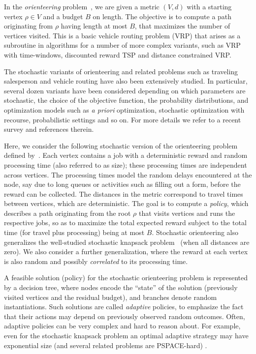 \documentclass[11pt,letterpaper]{article}
\numberwithin{algorithm}{section}
\begin{document}
In the {\em orienteering} problem~\cite{GLV87}, we are given a metric $(V,d)$ with a starting vertex $\rho\in V$ and a budget $B$ on length. The objective is to compute a path originating from $\rho$ having length at most $B$, that maximizes the number of vertices visited. This is a basic vehicle routing problem (VRP) that arises as a subroutine in algorithms for a number of more complex variants, such as VRP with
time-windows, discounted reward TSP and distance constrained VRP.


The stochastic variants of orienteering and related problems such as traveling salesperson and vehicle routing have also been extensively studied. In particular, several dozen variants have been considered depending on which parameters are stochastic, the choice of the objective function, the probability distributions, and optimization models such as {\em a priori} optimization, stochastic optimization with recourse, probabilistic settings and so on.
For more details we refer to a recent survey \cite{Weyland} and references therein.

Here, we consider the following stochastic version of the orienteering problem defined by~\cite{GKNR12}. Each vertex contains a job with a deterministic reward and random processing time (also referred to as size); these processing times are independent across vertices. The processing times  model the random delays encountered at the node, say due to long queues or activities such as filling out a form, before the reward can be collected. The distances in the metric correspond to travel times between vertices, which are deterministic. The goal is to compute a {\em policy}, which describes a path originating from the root $\rho$ that visits vertices and runs the respective jobs, so as to maximize the total expected reward subject to the total time (for travel plus processing) being at most $B$.
Stochastic orienteering also generalizes the well-studied stochastic knapsack problem~\cite{DeanGV08,BGK11,Bhalgat11} (when all distances are zero).
We also consider a further generalization, where the reward at each vertex is also random and possibly {\em correlated} to its processing time. 



A feasible solution (policy) for the stochastic orienteering problem is represented by a decision tree, where nodes encode the ``state'' of the solution (previously visited vertices and the residual budget), and branches denote random instantiations. Such solutions are called {\em adaptive} policies, to emphasize the fact that their actions may depend on previously observed random outcomes.
Often, adaptive policies can be very complex and hard to reason about.
For example, even for the stochastic knapsack problem an optimal adaptive strategy may have exponential size (and
several related problems are PSPACE-hard) \cite{DeanGV08}.
\end{document}

